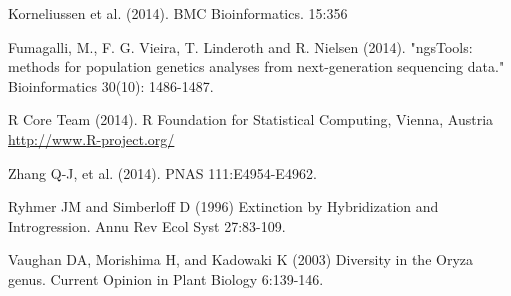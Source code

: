 \documentclass[final]{beamer}
\begin{document}
\begin{frame}[t]
\begin{multicols}{3}
\begin{thebibliography}{99}
 Korneliussen et al. (2014). BMC Bioinformatics. 15:356

 Fumagalli, M., F. G. Vieira, T. Linderoth and R. Nielsen (2014). "ngsTools: methods for population genetics analyses from next-generation sequencing data." Bioinformatics 30(10): 1486-1487.

 R Core Team (2014). R Foundation for Statistical Computing, Vienna, Austria \url{http://www.R-project.org/}

 Zhang Q-J, et al. (2014). PNAS 111:E4954-E4962.

Ryhmer JM and Simberloff D (1996) Extinction by Hybridization and Introgression. Annu Rev Ecol Syst 27:83-109.

Vaughan DA, Morishima H, and Kadowaki K (2003) Diversity in the Oryza genus. Current Opinion in Plant Biology 6:139-146.

\end{thebibliography}

\end{multicols}

\end{frame}
\end{document}
